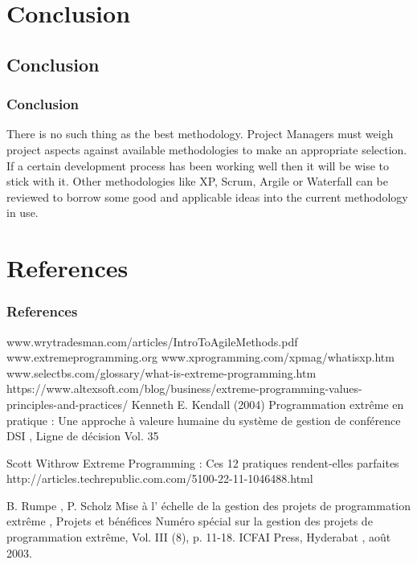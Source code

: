 \documentclass[
	11pt, 
]{beamer}
\begin{document}
\section{Conclusion}
\subsection{Conclusion}
\begin{frame}
	\frametitle{Conclusion}
	There is no such thing as the best methodology. Project Managers must weigh project aspects against available methodologies to make an
appropriate selection. If a certain development process has been working well then it will be wise to stick with it. Other methodologies like XP,
Scrum, Argile or Waterfall can be reviewed to borrow some good and applicable ideas into the current methodology in use.\cite{p7,p8}
	\bigskip %
\end{frame}
\section{References}
\begin{frame} %
	\frametitle{References}
	
	\begin{thebibliography}{99} %
		\footnotesize %
		
		 www.wrytradesman.com/articles/IntroToAgileMethods.pdf
		www.extremeprogramming.org
		www.xprogramming.com/xpmag/whatisxp.htm
		www.selectbs.com/glossary/what-is-extreme-programming.htm
		https://www.altexsoft.com/blog/business/extreme-programming-values-principles-and-practices/
			 Kenneth E. Kendall (2004)
			\newblock Programmation extrême en pratique : Une approche à valeure humaine du système de gestion
de conférence DSI , Ligne de décision Vol. 35

			Scott Withrow
			\newblock Extreme Programming : Ces 12 pratiques rendent-elles parfaites
http://articles.techrepublic.com.com/5100-22-11-1046488.html

			 B. Rumpe , P. Scholz
			\newblock Mise à l' échelle de la gestion des projets de programmation extrême , Projets et bénéfices
Numéro spécial sur la gestion des projets de programmation extrême, Vol. III (8), p. 11-18. ICFAI Press, Hyderabat ,
août 2003.
	\end{thebibliography}
\end{frame}
\end{document}
